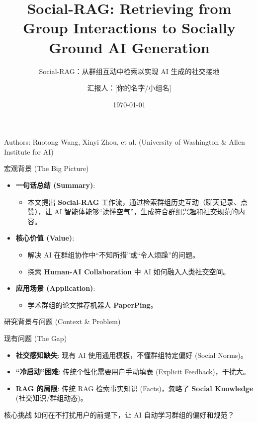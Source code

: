 \documentclass[aspectratio=169]{beamer}
\title[Social-RAG]{Social-RAG: Retrieving from Group Interactions to Socially Ground AI Generation}
\subtitle{Social-RAG：从群组互动中检索以实现 AI 生成的社交接地}
\author[Group Name]{汇报人：[你的名字/小组名]}
\institute[CHI 2025]{CHI 2025}
\date{\today}
\begin{document}
\begin{frame}
    \titlepage
    \begin{center}
        \small Authors: Ruotong Wang, Xinyi Zhou, et al. (University of Washington \& Allen Institute for AI)
    \end{center}
\end{frame}

\begin{frame}{宏观背景 (The Big Picture)}
    \begin{itemize}
        \item \textbf{一句话总结 (Summary)}: 
        \begin{itemize}
            \item 本文提出 \textbf{Social-RAG} 工作流，通过检索群组历史互动（聊天记录、点赞），让 AI 智能体能够“读懂空气”，生成符合群组兴趣和社交规范的内容。
        \end{itemize}
        \vspace{0.5cm}
        \item \textbf{核心价值 (Value)}:
        \begin{itemize}
            \item 解决 AI 在群组协作中“不知所措”或“令人烦躁”的问题。
            \item 探索 \textbf{Human-AI Collaboration} 中 AI 如何融入人类社交空间。
        \end{itemize}
        \vspace{0.5cm}
        \item \textbf{应用场景 (Application)}:
        \begin{itemize}
            \item 学术群组的论文推荐机器人 \textbf{PaperPing}。
        \end{itemize}
    \end{itemize}
\end{frame}

\begin{frame}{研究背景与问题 (Context \& Problem)}
    \begin{block}{现有问题 (The Gap)}
        \begin{itemize}
            \item \textbf{社交感知缺失}: 现有 AI 使用通用模板，不懂群组特定偏好 (Social Norms)。
            \item \textbf{“冷启动”困难}: 传统个性化需要用户手动填表 (Explicit Feedback)，干扰大。
            \item \textbf{RAG 的局限}: 传统 RAG 检索事实知识 (Facts)，忽略了 \textbf{Social Knowledge} (社交知识/群组动态)。
        \end{itemize}
    \end{block}
    
    \begin{alertblock}{核心挑战}
        如何在不打扰用户的前提下，让 AI 自动学习群组的偏好和规范？
    \end{alertblock}
\end{frame}
\end{document}
